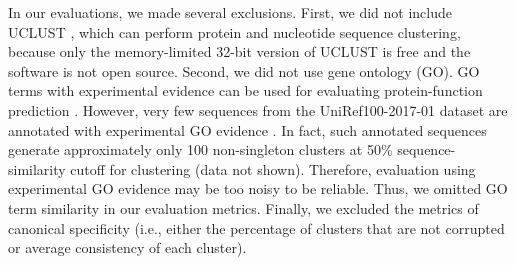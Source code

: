 \documentclass[11pt,letterpaper]{llncs2e/llncs}
\begin{document}
In our evaluations, we made several exclusions.
First, we did not include UCLUST \citep{edgar2010search}, which can perform protein and nucleotide sequence clustering, because only the memory-limited 32-bit version of UCLUST is free and the software is not open source.
Second, we did not use gene ontology (GO).
GO terms with experimental evidence can be used for evaluating protein-function prediction \citep{radivojac2013large}.
However, very few sequences from the UniRef100-2017-01 dataset are annotated with experimental GO evidence \citep{suzek2014uniref}.
In fact, such annotated sequences generate approximately only 100 non-singleton clusters at 50\% sequence-similarity cutoff for clustering (data not shown).
Therefore, evaluation using experimental GO evidence may be too noisy to be reliable.
Thus, we omitted GO term similarity in our evaluation metrics.
Finally, we excluded the metrics of canonical specificity (i.e., either the percentage of clusters that are not corrupted or average consistency of each cluster).
\end{document}
